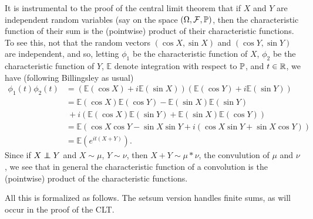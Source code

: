 \documentclass{article}
\theoremstyle{definition}
\renewcommand{\E}{\mathbb E}
\newcommand\indep{\protect\mathpalette{\protect\independenT}{\perp}}
\def\independenT#1#2{\mathrel{\rlap{$#1#2$}\mkern2mu{#1#2}}}
\begin{document}
It is instrumental to the proof of the central limit theorem that if $X$ and $Y$ are independent random variables (say on the space $(\Omega, \mathcal F, \P)$, then the characteristic function of their sum is the (pointwise) product of their characteristic functions. To see this, not that the random vectors $(\cos X, \sin X)$ and $(\cos Y, \sin Y)$ are independent, and so, letting $\phi_1$ be the characteristic function of $X$, $\phi_2$ be the characteristic function of $Y$, $\E$ denote integration with respect to $\P$, and $t \in \R$, we have (following Billingsley \cite{billingsley} as usual)
\begin{align*}
\phi_1(t)\phi_2(t) &= (\E(\cos X) + i\E(\sin X))(\E(\cos Y) + i\E(\sin Y)) \\
                   &= \E(\cos X) \E(\cos Y) - \E(\sin X)\E(\sin Y) \\
                   & \ + i(\E(\cos X)\E(\sin Y) + \E(\sin X)\E(\cos Y)) \\
                   &= \E(\cos X \cos Y - \sin X \sin Y + i(\cos X \sin Y + \sin X \cos Y)) \\
                   &= \E(e^{it(X + Y)}).
\end{align*}
Since if $X \indep Y$ and $X \sim \mu$, $Y \sim \nu$, then $X + Y \sim \mu * \nu$, the convulution of $\mu$ and $\nu$, we see that in general the characteristic function of a convolution is the (pointwise) product of the characteristic functions.

All this is formalized as follows. The setsum version handles finite sums, as will occur in the proof of the CLT.\phantom{)}

\medskip
\end{document}
